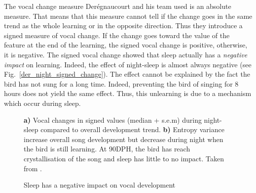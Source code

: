\documentclass{report}
\begin{document}
The vocal change measure Derégnaucourt and his team used is an absolute measure.
That means that this measure cannot tell if the change goes in the same trend as
the whole learning or in the opposite direction. Thus they introduce a signed
measure of vocal change. If the change goes toward the value of the feature
at the end of the learning, the signed vocal change is positive, otherwise, it
is negative. The signed vocal change showed that sleep actually has a
\emph{negative impact} on learning. Indeed, the effect of night-sleep is almost
always negative (see Fig.~\ref{der_night_signed_change}). The effect cannot be
explained by the fact the bird has not sung for a long time. Indeed, preventing
the bird of singing for 8 hours does not yield the same effect. Thus, this
unlearning is due to a mechanism which occur during sleep.

\begin{figure}[htpb]
  {\center
  }
  \caption{Sleep has a negative impact on vocal development}
  \small
  \textbf{a)} Vocal changes in signed values (median + s.e.m) during night-sleep compared to overall development trend.
  \textbf{b)} Entropy variance increase overall song development but decrease
  during night when the bird is still learning. At 90DPH, the bird has reach crystallisation of the song and sleep has little to no impact.
  Taken from \textcite{deregnaucourt_how_2005}.
\end{figure}
\end{document}
